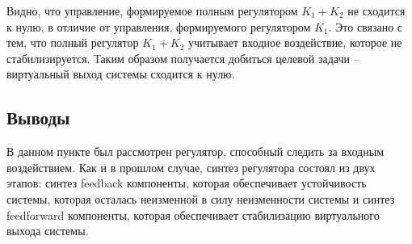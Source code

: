 Видно, что управление, формируемое полным регулятором $K_1 + K_2$ не сходится к нулю, 
в отличие от управления, формируемого регулятором $K_1$. Это связано с тем, что 
полный регулятор $K_1 + K_2$ учитывает входное воздействие, которое не стабилизируется. 
Таким образом получается добиться целевой задачи -- виртуальный выход системы
сходится к нулю. 
\FloatBarrier

\subsection{Выводы}
В данном пункте был рассмотрен регулятор, способный следить за входным воздействием. 
Как и в прошлом случае, синтез регулятора состоял из двух этапов: синтез feedback компоненты, 
которая обеспечивает устойчивость системы, которая осталась неизменной в силу 
неизменности системы и синтез feedforward компоненты, которая обеспечивает 
стабилизацию виртуального выхода системы. 

